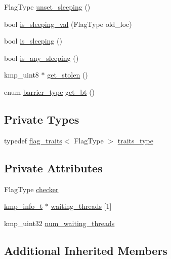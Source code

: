 \begin{DoxyCompactItemize}
\item 
Flag\-Type \hyperlink{classkmp__basic__flag_a6867e3744945bc7dd573c65684695a22}{unset\-\_\-sleeping} ()
\item 
bool \hyperlink{classkmp__basic__flag_ace5db2765c8401a9f19ba2d39942baf4}{is\-\_\-sleeping\-\_\-val} (Flag\-Type old\-\_\-loc)
\item 
bool \hyperlink{classkmp__basic__flag_a7a24177cc9ee6800ba0b9ec3b32e7e3c}{is\-\_\-sleeping} ()
\item 
bool \hyperlink{classkmp__basic__flag_a316cabead194d9e904c0e2277c008587}{is\-\_\-any\-\_\-sleeping} ()
\item 
kmp\-\_\-uint8 $\ast$ \hyperlink{classkmp__basic__flag_ac49c9ce721d91f321d1cfccc06a685cf}{get\-\_\-stolen} ()
\item 
enum \hyperlink{kmp_8h_ad0f7c21f2f1d446087ef5714eb0fd8cf}{barrier\-\_\-type} \hyperlink{classkmp__basic__flag_abe1042797aee6220578ad29522b2e956}{get\-\_\-bt} ()
\end{DoxyCompactItemize}
\subsection*{Private Types}
\begin{DoxyCompactItemize}
\item 
typedef \hyperlink{structflag__traits}{flag\-\_\-traits}$<$ Flag\-Type $>$ \hyperlink{classkmp__basic__flag_a219ab80d54e50ffdd6db76d698b74246}{traits\-\_\-type}
\end{DoxyCompactItemize}
\subsection*{Private Attributes}
\begin{DoxyCompactItemize}
\item 
Flag\-Type \hyperlink{classkmp__basic__flag_ab23a153efd5b913c52cfe0999722812f}{checker}
\item 
\hyperlink{kmp_8h_a194859801fe16b326efe34501a37c30a}{kmp\-\_\-info\-\_\-t} $\ast$ \hyperlink{classkmp__basic__flag_a7011d738e46e39cd78dfad7eed5e79d5}{waiting\-\_\-threads} \mbox{[}1\mbox{]}
\item 
kmp\-\_\-uint32 \hyperlink{classkmp__basic__flag_a71d958593d12ea5389ca5a32864d276c}{num\-\_\-waiting\-\_\-threads}
\end{DoxyCompactItemize}
\subsection*{Additional Inherited Members}


